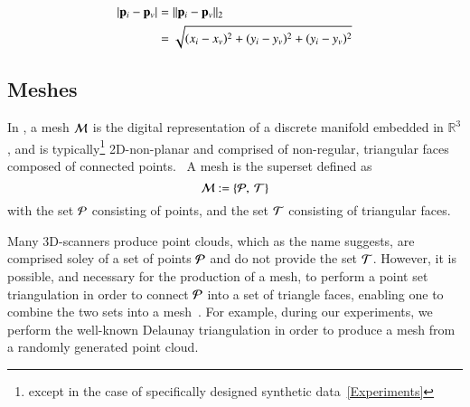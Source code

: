 \begin{equation}
\begin{aligned}
	|\mathbf{p}_i - \mathbf{p}_v| & = \lVert\mathbf{p}_i - \mathbf{p}_v\rVert_2 \\
					& = \sqrt{(x_i-x_v)^2 + (y_i-y_v)^2 + (y_i-y_v)^2}
	\label{eq:defineEdgeLengthCalc}
\end{aligned}
\end{equation}

%
%
%
\subsection{Meshes}
\label{ch2s3ssM}
In \tdd{}, a mesh $\mathcal{M}$ is the digital representation of a discrete manifold embedded in $\mathbb{R}^3$, and is typically\footnote{except in the case of specifically designed synthetic data~\ref{Experiments}} 2D-non-planar and comprised of non-regular, triangular faces composed of connected points.~\cite[p.~25]{Mara12} A mesh is the superset defined as
%
\begin{equation}
	\mathcal{M} := \left \{\mathcal{P},\:\mathcal{T}\right \}
	\label{eq:defineMesh}
\end{equation}%
%
%
with the set $\mathcal{P}$ consisting of points, and the set $\mathcal{T}$ consisting of triangular faces.

Many 3D-scanners produce point clouds\todoCitation{}{}, which as the name suggests, are comprised soley of a set of points $\mathcal{P}$ and do not provide the set $\mathcal{T}$. However, it is possible, and necessary for the production of a mesh, to perform a point set triangulation\todoCitation{}{} in order to connect $\mathcal{P}$ into a set of triangle faces, enabling one to combine the two sets into a mesh~\cite[p.~26]{Mara12}. For example, during our experiments, we perform the well-known Delaunay triangulation\todoCitation{} in order to produce a mesh from a randomly generated point cloud.

%
%
%
